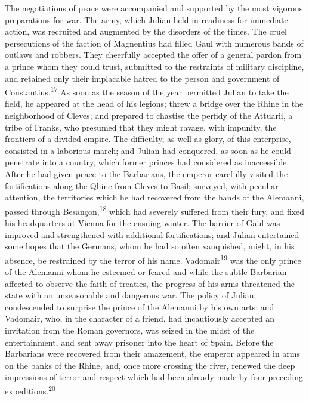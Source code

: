 


The negotiations of peace were accompanied and supported by the
most vigorous preparations for war. The army, which Julian held
in readiness for immediate action, was recruited and augmented by
the disorders of the times. The cruel persecutions of the faction
of Magnentius had filled Gaul with numerous bands of outlaws and
robbers. They cheerfully accepted the offer of a general pardon
from a prince whom they could trust, submitted to the restraints
of military discipline, and retained only their implacable hatred
to the person and government of Constantius.\textsuperscript{17} As soon as the
season of the year permitted Julian to take the field, he
appeared at the head of his legions; threw a bridge over the
Rhine in the neighborhood of Cleves; and prepared to chastise the
perfidy of the Attuarii, a tribe of Franks, who presumed that
they might ravage, with impunity, the frontiers of a divided
empire. The difficulty, as well as glory, of this enterprise,
consisted in a laborious march; and Julian had conquered, as soon
as he could penetrate into a country, which former princes had
considered as inaccessible. After he had given peace to the
Barbarians, the emperor carefully visited the fortifications
along the Qhine from Cleves to Basil; surveyed, with peculiar
attention, the territories which he had recovered from the hands
of the Alemanni, passed through Besançon,\textsuperscript{18} which had severely
suffered from their fury, and fixed his headquarters at Vienna
for the ensuing winter. The barrier of Gaul was improved and
strengthened with additional fortifications; and Julian
entertained some hopes that the Germans, whom he had so often
vanquished, might, in his absence, be restrained by the terror of
his name. Vadomair\textsuperscript{19} was the only prince of the Alemanni whom he
esteemed or feared and while the subtle Barbarian affected to
observe the faith of treaties, the progress of his arms
threatened the state with an unseasonable and dangerous war. The
policy of Julian condescended to surprise the prince of the
Alemanni by his own arts: and Vadomair, who, in the character of
a friend, had incautiously accepted an invitation from the Roman
governors, was seized in the midst of the entertainment, and sent
away prisoner into the heart of Spain. Before the Barbarians were
recovered from their amazement, the emperor appeared in arms on
the banks of the Rhine, and, once more crossing the river,
renewed the deep impressions of terror and respect which had been
already made by four preceding expeditions.\textsuperscript{20}

